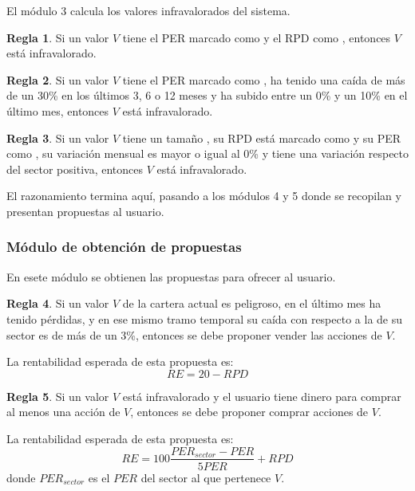 \documentclass[a4paper, 11pt, titlepage]{article}
\theoremstyle{definition}
\newtheorem{regla}{Regla}
\begin{document}
  El módulo 3 calcula los valores infravalorados del sistema.

  \begin{regla}
      Si un valor $V$ tiene el PER marcado como  y el RPD como , entonces $V$ está infravalorado.
  \end{regla}

  \begin{regla}
      Si un valor $V$ tiene el PER marcado como , ha tenido una caída de más de un 30\% en los últimos 3, 6 o 12 meses y ha subido entre un 0\% y un 10\% en el último mes, entonces $V$ está infravalorado.
  \end{regla}

  \begin{regla}
      Si un valor $V$ tiene un tamaño , su RPD está marcado como  y su PER como , su variación mensual es mayor o igual al 0\% y tiene una variación respecto del sector positiva, entonces $V$ está infravalorado.
  \end{regla}

  El razonamiento termina aquí, pasando a los módulos 4 y 5 donde se recopilan
  y presentan propuestas al usuario.

  \subsubsection{Módulo de obtención de propuestas}

  En esete módulo se obtienen las propuestas para ofrecer al usuario.

  \begin{regla}
        Si un valor $V$ de la cartera actual es peligroso, en el último mes ha tenido pérdidas, y en ese mismo tramo temporal su caída con respecto a la de su sector es de más de un 3\%, entonces se debe proponer vender las acciones de $V$.

        La rentabilidad esperada de esta propuesta es:
        \[
        RE = 20 - RPD
        \]
    \end{regla}

    \begin{regla}
        Si un valor $V$ está infravalorado y el usuario tiene dinero para comprar al menos una acción de $V$, entonces se debe proponer comprar acciones de $V$.

        La rentabilidad esperada de esta propuesta es:
        \[
        RE = 100 \frac{PER_{sector} - PER}{5 PER} + RPD
        \]
        donde $PER_{sector}$ es el $PER$ del sector al que pertenece $V$.
    \end{regla}
\end{document}

